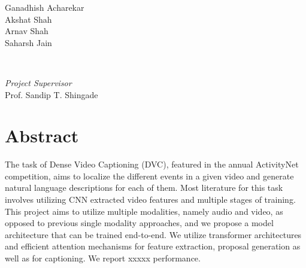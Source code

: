 \documentclass[]{book}
\begin{document}
\begin{titlepage}
	\begin{minipage}{0.4\textwidth}
		\begin{flushleft}
			\large
			Ganadhish Acharekar\\
			Akshat Shah\\
			Arnav Shah\\
			Saharsh Jain
		\end{flushleft}
	\end{minipage}
	~
	\begin{minipage}{0.4\textwidth}
		\begin{flushright}
			\large
			\textit{Project Supervisor}\\
			Prof. Sandip T. Shingade
		\end{flushright}
	\end{minipage}
	
	
	
	
	
	
	 
	
	\vfill %
	
\end{titlepage}


\chapter*{Abstract}
The task of Dense Video Captioning (DVC), featured in the annual ActivityNet competition, aims to localize the different events in a given video and generate natural language descriptions for each of them. Most literature for this task involves utilizing CNN extracted video features and multiple stages of training. This project aims to utilize multiple modalities, namely audio and video, as opposed to previous single modality approaches, and we propose a model architecture that can be trained end-to-end. We utilize transformer architectures and efficient attention mechanisms for feature extraction, proposal generation as well as for captioning. We report xxxxx performance.
\end{document}
